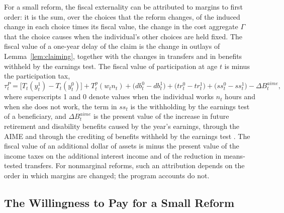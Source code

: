 For a small reform, the fiscal externality can be attributed to margins to first order: it is the sum, over the choices that the reform changes, of the induced change in each choice times its fiscal value, the change in the cost aggregate $\Gamma$ that the choice causes when the individual's other choices are held fixed. The fiscal value of a one-year delay of the claim is the change in outlays of Lemma~\ref{lem:claiming}, together with the changes in transfers and in benefits withheld by the earnings test. The fiscal value of participation at age $t$ is minus the participation tax,
\begin{equation*}
\tau^{P}_t=\big[T_t(y^{1}_t)-T_t(y^{0}_t)\big]+T^{p}_t(w_t n_t)+\big(db^{0}_t-db^{1}_t\big)+\big(tr^{0}_t-tr^{1}_t\big)+\big(ss^{0}_t-ss^{1}_t\big)-\Delta B^{aime}_t,
\end{equation*}
where superscripts 1 and 0 denote values when the individual works $n_t$ hours and when she does not work, the term in $ss_t$ is the withholding by the earnings test of a beneficiary, and $\Delta B^{aime}_t$ is the present value of the increase in future retirement and disability benefits caused by the year's earnings, through the AIME and through the crediting of benefits withheld by the earnings test \citep[see][for participation tax rates]{kleven2006marginal}. The fiscal value of an additional dollar of assets is minus the present value of the income taxes on the additional interest income and of the reduction in means-tested transfers. For nonmarginal reforms, such an attribution depends on the order in which margins are changed; the program accounts do not.

\subsection{The Willingness to Pay for a Small Reform}


